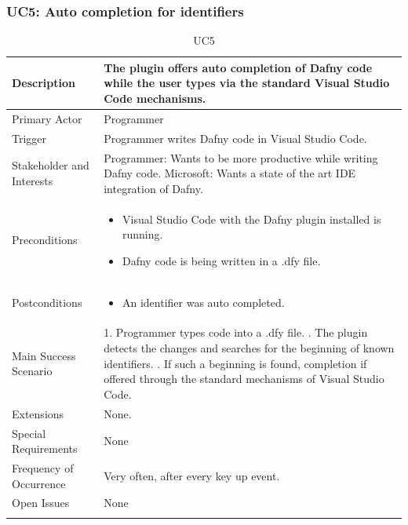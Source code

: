 \subsubsection{UC5: Auto completion for identifiers}
\begin{longtable}{l | p{} }
	Description & The plugin offers auto completion of Dafny code while the user types via the standard Visual Studio Code mechanisms.\\ \hline
	Primary Actor & Programmer\\ \hline
	Trigger & Programmer writes Dafny code in Visual Studio Code.\\ \hline
	Stakeholder and Interests & Programmer: Wants to be more productive while writing Dafny code. \newline Microsoft: Wants a state of the art IDE integration of Dafny.\\ \hline
	Preconditions &
	\begin{itemize}
		\item Visual Studio Code with the Dafny plugin installed is running.
		\item Dafny code is being written in a .dfy file.
	\end{itemize}\\ \hline
	Postconditions &
	\begin{itemize}
		\item An identifier was auto completed.
	\end{itemize}\\ \hline
	Main Success Scenario & 
	1. Programmer types code into a .dfy file. \newline
	2. The plugin detects the changes and searches for the beginning of known identifiers. \newline
	3. If such a beginning is found, completion if offered through the standard mechanisms of Visual Studio Code.\\ \hline
	Extensions & 
	None. \\ \hline
	Special Requirements & None\\ \hline
	Frequency of Occurrence & Very often, after every key up event.\\ \hline
	Open Issues & None \\ \hline
	\caption{UC5}
\end{longtable}